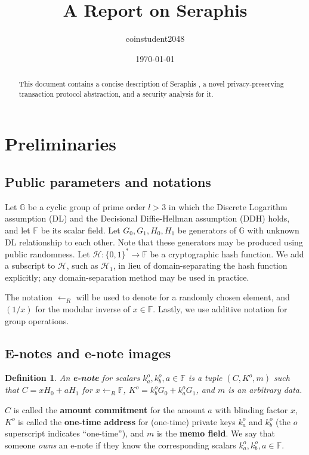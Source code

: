 \documentclass{article}
\title{A Report on Seraphis}
\author{coinstudent2048}
\date{\today}
\newtheorem{definition}{Definition}[section]
\begin{document}
\maketitle

\begin{abstract}
This document contains a concise description of Seraphis \cite{seraphis}, a novel privacy-preserving transaction protocol abstraction, and a security analysis for it.
\end{abstract}

\section{Preliminaries}
\subsection{Public parameters and notations}
\noindent Let $\mathbb{G}$ be a cyclic group of prime order $l>3$ in which the Discrete Logarithm assumption (DL) and the Decisional Diffie-Hellman assumption (DDH) holds, and let $\mathbb{F}$ be its scalar field. Let $G_0, G_1, H_0, H_1$ be generators of $\mathbb{G}$ with unknown DL relationship to each other. Note that these generators may be produced using public randomness. Let $\mathcal{H}:\{0,1\}^*\rightarrow\mathbb{F}$ be a cryptographic hash function. We add a subscript to $\mathcal{H}$, such as $\mathcal{H}_1$, in lieu of domain-separating the hash function explicitly; any domain-separation method may be used in practice.

The notation $\leftarrow_R$ will be used to denote for a randomly chosen element, and $(1/x)$ for the modular inverse of $x\in\mathbb{F}$. Lastly, we use additive notation for group operations.

\subsection{E-notes and e-note images}
\begin{definition}\label{e-note}
An \textbf{\em e-note} for scalars $k_a^o, k_b^o, a \in\mathbb{F}$ is a tuple $(C, K^o, m)$ such that $C=xH_0+aH_1$ for $x\leftarrow_R\mathbb{F}$, $K^o=k_b^o G_0 + k_a^o G_1$, and $m$ is an arbitrary data.
\end{definition}
$C$ is called the \textbf{amount commitment} for the amount $a$ with blinding factor $x$, $K^o$ is called the \textbf{one-time address} for (one-time) private keys $k_a^o$ and $k_b^o$ (the $o$ superscript indicates ``one-time''), and $m$ is the \textbf{memo field}. We say that someone \textit{owns} an e-note if they know the corresponding scalars $k_a^o, k_b^o, a \in\mathbb{F}$.
\end{document}
